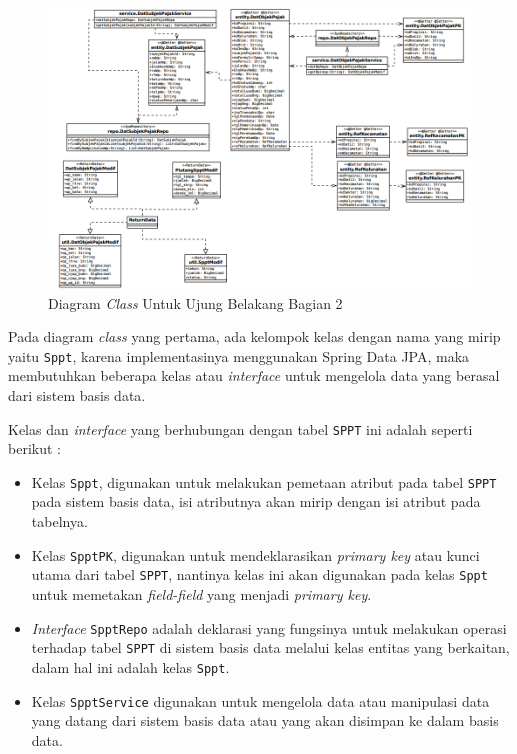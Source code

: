 \documentclass[pdftex,12pt, oneside]{article}
\begin{document}
\begin{figure}[H]
	\centering
	\includegraphics[width=1\textwidth]{./resources/class-dia-be2}
	\caption{Diagram \textit{Class} Untuk Ujung Belakang Bagian 2}
	\label{fig:class-dia-be2}
\end{figure}

Pada diagram \textit{class} yang pertama, ada kelompok kelas dengan nama yang mirip yaitu \texttt{Sppt}, karena implementasinya menggunakan Spring Data JPA, maka membutuhkan beberapa kelas atau \textit{interface} untuk mengelola data yang berasal dari sistem basis data.

Kelas dan \textit{interface} yang berhubungan dengan tabel \texttt{SPPT} ini adalah seperti berikut :

\begin{itemize}	
	\item Kelas \texttt{Sppt}, digunakan untuk melakukan pemetaan atribut pada tabel \texttt{SPPT} pada sistem basis data, isi atributnya akan mirip dengan isi atribut pada tabelnya.
	\item Kelas \texttt{SpptPK}, digunakan untuk mendeklarasikan \textit{primary key} atau kunci utama dari tabel \texttt{SPPT}, nantinya kelas ini akan digunakan pada kelas \texttt{Sppt} untuk memetakan \textit{field-field} yang menjadi \textit{primary key}.
	\item \textit{Interface} \texttt{SpptRepo} adalah deklarasi yang fungsinya untuk melakukan operasi terhadap tabel \texttt{SPPT} di sistem basis data melalui kelas entitas yang berkaitan, dalam hal ini adalah kelas \texttt{Sppt}.
	\item Kelas \texttt{SpptService} digunakan untuk mengelola data atau manipulasi data yang datang dari sistem basis data atau yang akan disimpan ke dalam basis data.
\end{itemize}
\end{document}
